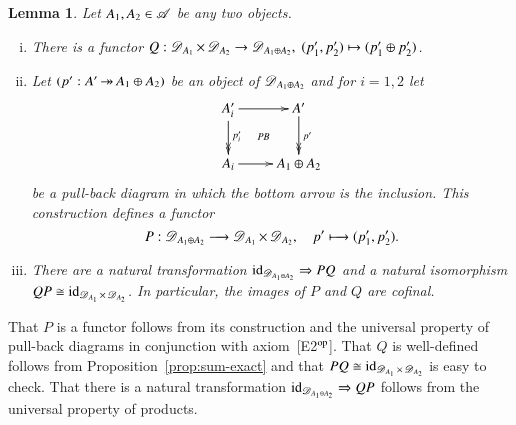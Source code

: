 \documentclass[1p]{elsarticle}
\makeatletter
\renewenvironment{proof}[1][\proofname]{\par
  \pushQED{\qed}%
  \normalfont \topsep6\p@\@plus6\p@\relax
  \trivlist
  \item[\hskip\labelsep
        \scshape
    #1\@addpunct{.}]\ignorespaces
}{%
  \popQED\endtrivlist\@endpefalse
}
\theoremstyle{mythm}
\newtheorem{Lem}[Thm]{Lemma}
\theoremstyle{mydef}
\makeatother
\begin{document}
\begin{Lem}
  \label{lem:dir-cat}
  Let $A_{1}, A_{2} \in \operatorname{\mathscr{A}}$ be any two objects.
  \begin{enumerate}[(i)]
    \item
      There is a functor
      $Q: \operatorname{\mathscr{D}}_{A_{1}} \times \operatorname{\mathscr{D}}_{A_{2}} \to
      \operatorname{\mathscr{D}}_{A_{1} \oplus A_{2}},\;
      (p_{1}', p_{2}') \mapsto (p_{1}' \oplus p_{2}')$.

    \item
      Let $(p':A' \operatorname{\twoheadrightarrow} A_{1} \oplus A_{2})$
      be an object of $\operatorname{\mathscr{D}}_{A_{1} \oplus A_{2}}$ and for $i=1,2$ let 
      \[
      \xymatrix{
        A_{i}' \ar[r] \ar@{}[dr]|{\text{\emph{PB}}}
        \ar@{->>}[d]^{p_{i}'} &
        A' \ar@{->>}[d]^{p'} \\
        A_{i} \ar[r] & A_{1} \oplus A_{2}
      }
      \]
      be a pull-back diagram in which the bottom arrow is the
      inclusion. This construction defines a functor
      \[
      P: \operatorname{\mathscr{D}}_{A_{1} \oplus A_{2}} \longrightarrow
      \operatorname{\mathscr{D}}_{A_{1}} \times \operatorname{\mathscr{D}}_{A_{2}},
      \quad p' \longmapsto (p_{1}', p_{2}').
      \]
      
    \item
      There are a natural transformation
      $\operatorname{id}_{\operatorname{\mathscr{D}}_{A_{1} \oplus A_{2}}} \Rightarrow PQ$
      and a natural isomorphism 
      $QP \cong \operatorname{id}_{\operatorname{\mathscr{D}}_{A_{1}} \times \operatorname{\mathscr{D}}_{A_{2}}}$. In particular,
      the images of $P$ and $Q$ are cofinal.
  \end{enumerate}
\end{Lem}
\begin{proof}
  That $P$ is a functor follows from its construction and the
  universal property of pull-back diagrams in conjunction with
  axiom~[E2$^{\operatorname{op}}$].
  That $Q$ is well-defined follows from Proposition~\ref{prop:sum-exact} and
  that $PQ \cong \operatorname{id}_{\operatorname{\mathscr{D}}_{A_{1}} \times \operatorname{\mathscr{D}}_{A_{2}}}$ is easy to check.
  That there is a natural transformation
  $\operatorname{id}_{\operatorname{\mathscr{D}}_{A_{1} \oplus A_{2}}} \Rightarrow QP$ follows from the
  universal property of products.
\end{proof}
\end{document}
